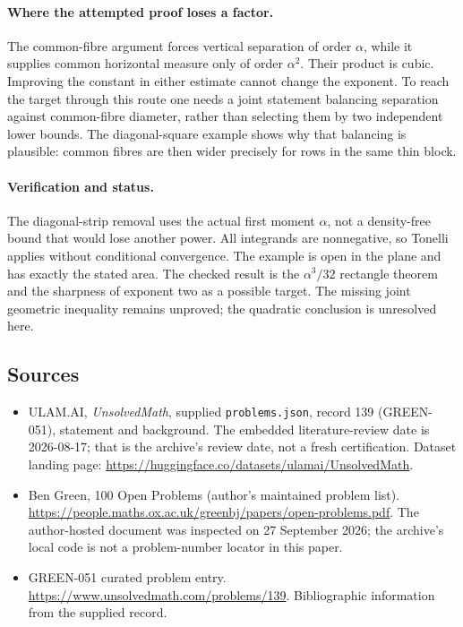 \documentclass[11pt,a4paper]{article}
\begin{document}
\paragraph{Where the attempted proof loses a factor.}
The common-fibre argument forces vertical separation of order $\alpha$, while it supplies common horizontal measure only of order $\alpha^2$. Their product is cubic. Improving the constant in either estimate cannot change the exponent. To reach the target through this route one needs a joint statement balancing separation against common-fibre diameter, rather than selecting them by two independent lower bounds. The diagonal-square example shows why that balancing is plausible: common fibres are then wider precisely for rows in the same thin block.

\paragraph{Verification and status.}
The diagonal-strip removal uses the actual first moment $\alpha$, not a density-free bound that would lose another power. All integrands are nonnegative, so Tonelli applies without conditional convergence. The example is open in the plane and has exactly the stated area. The checked result is the $\alpha^3/32$ rectangle theorem and the sharpness of exponent two as a possible target. The missing joint geometric inequality remains unproved; the quadratic conclusion is unresolved here.

\subsection{Sources}

{\small

\begin{itemize}

\item[\hypertarget{source:139:1}{S1}] ULAM.AI, \emph{UnsolvedMath}, supplied \texttt{problems.json}, record 139 (GREEN-051), statement and background. The embedded literature-review date is 2026-08-17; that is the archive’s review date, not a fresh certification. Dataset landing page: \url{https://huggingface.co/datasets/ulamai/UnsolvedMath}.

\item[\hypertarget{source:139:2}{S2}] Ben Green, 100 Open Problems (author’s maintained problem list). \url{https://people.maths.ox.ac.uk/greenbj/papers/open-problems.pdf}. The author-hosted document was inspected on 27 September 2026; the archive’s local code is not a problem-number locator in this paper.

\item[\hypertarget{source:139:3}{S3}] GREEN-051 curated problem entry. \url{https://www.unsolvedmath.com/problems/139}. Bibliographic information from the supplied record.

\end{itemize}

}

\label{end:139}
\end{document}
